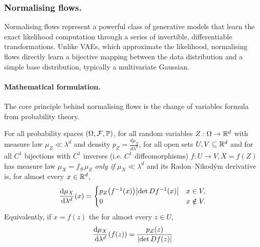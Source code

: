     \subsubsection{Normalising flows.}
        Normalising flows represent a powerful class of generative models that learn the exact likelihood computation through a series of invertible, differentiable transformations.
        Unlike VAEs, which approximate the likelihood, normalising flows directly learn a bijective mapping between the data distribution and a simple base distribution, typically a multivariate Gaussian.

        \paragraph{Mathematical formulation.}
            The core principle behind normalising flows is the change of variables formula from probability theory.
        \begin{theorem}\label{thm:cov-measure}
            For all probability spaces \((\Omega,\mathcal{F},\P)\), for all random variables \(Z:\Omega\to\R^d\) with measure law \(\mu_Z\ll\lambda^d\) and density \(p_Z=\frac{d\mu_Z}{d\lambda^d}\), for all open sets \(U,V\subseteq\R^d\) and for all \(C^1\) bijections with \(C^1\) inverses (i.e. \(C^1\) diffeomorphisms) \(f:U\to V, X=f(Z)\) has measure law \(\mu_X=f_{\#}\mu_Z\) \emph{only if} \(\mu_X\ll\lambda^d\) and its Radon--Nikod\'ym derivative~\cite{fremlin_measure_2000, noauthor_measure_nodate} is, for almost every $x\in\R^d$,
        \[
            \frac{\dd\mu_X}{\dd\lambda^d}(x) =
            \begin{cases}
                p_Z \qty(f\inv(x))\qty|\det D f^{-1}(x)| & x\in V,\\
                0                                       & x\notin V.
        \end{cases}
        \]
        Equivalently, if $x=f(z)$ the for almost every \(z\in U,\)
        \[
        \frac{\dd\mu_X}{\dd\lambda^d}\qty(f(z))
        =
        \frac{p_Z(z)}{\qty|\det D f(z)|}
        \]
        \end{theorem}

